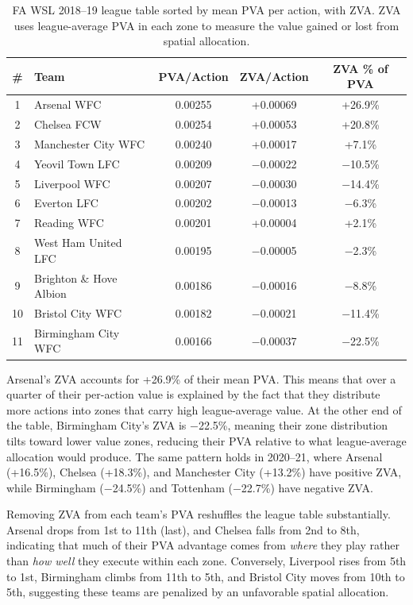 \documentclass[12pt,a4paper]{article}
\begin{document}
\begin{table}[H]
\centering
\caption{FA WSL 2018--19 league table sorted by mean PVA per action, with ZVA. ZVA uses league-average PVA in each zone to measure the value gained or lost from spatial allocation.}
\label{tab:zva}
\begin{tabular}{clccc}
\toprule
\textbf{\#} & \textbf{Team} & \textbf{PVA/Action} & \textbf{ZVA/Action} & \textbf{ZVA \% of PVA} \\
\midrule
1  & Arsenal WFC             & 0.00255 & +0.00069 & +26.9\% \\
2  & Chelsea FCW              & 0.00254 & +0.00053 & +20.8\% \\
3  & Manchester City WFC      & 0.00240 & +0.00017 & +7.1\% \\
4  & Yeovil Town LFC          & 0.00209 & $-$0.00022 & $-$10.5\% \\
5  & Liverpool WFC            & 0.00207 & $-$0.00030 & $-$14.4\% \\
6  & Everton LFC              & 0.00202 & $-$0.00013 & $-$6.3\% \\
7  & Reading WFC              & 0.00201 & +0.00004 & +2.1\% \\
8  & West Ham United LFC      & 0.00195 & $-$0.00005 & $-$2.3\% \\
9  & Brighton \& Hove Albion  & 0.00186 & $-$0.00016 & $-$8.8\% \\
10 & Bristol City WFC         & 0.00182 & $-$0.00021 & $-$11.4\% \\
11 & Birmingham City WFC      & 0.00166 & $-$0.00037 & $-$22.5\% \\
\bottomrule
\end{tabular}
\end{table}

Arsenal's ZVA accounts for +26.9\% of their mean PVA. This means that over a quarter of their per-action value is explained by the fact that they distribute more actions into zones that carry high league-average value. At the other end of the table, Birmingham City's ZVA is $-$22.5\%, meaning their zone distribution tilts toward lower value zones, reducing their PVA relative to what league-average allocation would produce. The same pattern holds in 2020--21, where Arsenal (+16.5\%), Chelsea (+18.3\%), and Manchester City (+13.2\%) have positive ZVA, while Birmingham ($-$24.5\%) and Tottenham ($-$22.7\%) have negative ZVA.

Removing ZVA from each team's PVA reshuffles the league table substantially. Arsenal drops from 1st to 11th (last), and Chelsea falls from 2nd to 8th, indicating that much of their PVA advantage comes from \emph{where} they play rather than \emph{how well} they execute within each zone. Conversely, Liverpool rises from 5th to 1st, Birmingham climbs from 11th to 5th, and Bristol City moves from 10th to 5th, suggesting these teams are penalized by an unfavorable spatial allocation.
\end{document}
